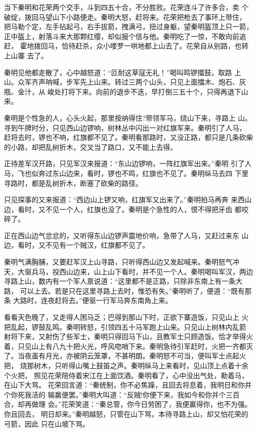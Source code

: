 当下秦明和花荣两个交手，斗到四五十合，不分胜败。花荣连斗了许多合，卖
个破绽，拨回马望山下小路便走。秦明大怒，赶将来。花荣把枪去了事环上带住，
把马勒个定，左手拈起弓，右手拔箭，拽满弓，扭过身躯，望秦明盔顶上只一箭，
正中盔上，射落斗来大那颗红缨，却似报个信与他。秦明吃了一惊，不敢向前追赶，
霍地拨回马，恰待赶杀，众小喽罗一哄地都上山去了。花荣自从别路，也转上山寨
去了。

秦明见他都走散了，心中越怒道：“叵耐这草寇无礼！”喝叫鸣锣擂鼓，取路
上山。众军齐声呐喊，步军先上山来。转过三两个山头，只见上面擂木、炮石、灰
瓶、金汁，从峻处打将下来。向前的退步不迭，早打倒三五十个，只得再退下山
来。

秦明是个性急的人，心头火起，那里按纳得住?带领军马，绕山下来，寻路上
山。寻到午牌时分，只见西山边锣响，树林丛中闪出一对红旗军来。秦明引了人马，
赶将去时，锣也不响，红旗都不见了。秦明看那路时，又没正路，都只是几条砍柴
的小路，却把乱树折木，交叉当了路口，又不能上去得。

正待差军汉开路，只见军汉来报道：“东山边锣响，一阵红旗军出来。”秦明
引了人马，飞也似奔过东山边来，看时，锣也不鸣，红旗也不见了。秦明纵马去四
下里寻路时，都是乱树折木，断塞了砍柴的路径。

只见探事的又来报道：“西边山上锣又响，红旗军又出来了。”秦明拍马再奔
来西山边，看时，又不见一个人，红旗也没了。秦明是个急性的人，恨不得把牙齿
都咬碎了。

正在西山边气忿忿的，又听得东山边锣声震地价响，急带了人马，又赶过来东
山边，看时，又不见有一个贼汉，红旗都不见了。

秦明气满胸脯，又要赶军汉上山寻路，只听得西山边又发起喊来。秦明怒气冲
天，大驱兵马，投西山边来，山上山下看时，并不见一个人。秦明喝叫军汉，两边
寻路上山，数内有一个军人禀说道：“这里都不是正路，只除非东南上有一条大路，
可以上去。若是只在这里寻路上去时，惟恐有失。”秦明听了，便道：“既有那条
大路时，连夜赶将去。”便驱一行军马奔东南角上来。

看看天色晚了，又走得人困马乏；巴得到那山下时，正欲下寨造饭，只见山上
火把乱起，锣鼓乱鸣。秦明转怒，引领四五十马军跑上山来。只见山上树林内乱箭
射将下来，又射伤了些军士，秦明只得回马下山，且教军士只顾造饭。恰才举得火
着，只见山上有八九十把火光，呼风唿哨下来。秦明急待引军赶时，火把一齐都灭
了。当夜虽有月光，亦被阴云笼罩，不甚明朗。秦明怒不可当，便叫军士点起火把，
烧那树木，只听得山嘴上鼓笛之声。秦明纵马上来看时，见山顶上点着十余个火把，
照见花荣陪侍着宋江在上面饮酒。秦明看了，心中没出气处，勒着马，在山下大骂。
花荣回言道：“秦统制，你不必焦躁，且回去将息着，我明日和你并个你死我活的
输赢便罢。”秦明大叫道：“反贼!你便下来，我如今和你并个三百合，却再做理
会。”花荣笑道：“秦总管，你今日劳困了，我便赢得你，也不为强。你且回去，
明日却来。”秦明越怒，只管在山下骂，本待寻路上山，却又怕花荣的弓箭，因此
只在山坡下骂。

